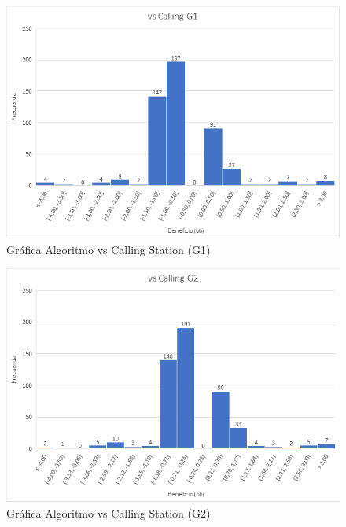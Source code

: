 \begin{figure}[h]
\centering
\includegraphics[width=1\textwidth]{figuras/AvCG1.png}   
\caption{Gráfica Algoritmo vs Calling Station (G1)}
\label{fig:AvRC1}
\end{figure}

\begin{figure}[h]
\centering
\includegraphics[width=1\textwidth]{figuras/AvCG2.png}   
\caption{Gráfica Algoritmo vs Calling Station (G2)}
\label{fig:AvRC2}
\end{figure}


